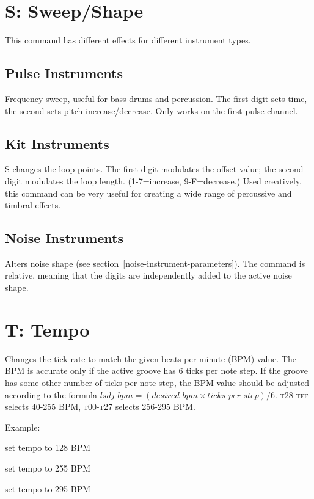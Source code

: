 \section{S: Sweep/Shape}

This command has different effects for different instrument types.

\subsection{Pulse Instruments}

Frequency sweep, useful for bass drums and percussion. The first digit sets time, the second sets pitch increase/decrease. Only works on the first pulse channel.

\subsection{Kit Instruments}

S changes the loop points. The first digit modulates the offset value; the second digit modulates the loop length. (1-7=increase, 9-F=decrease.) Used creatively, this command can be very useful for creating a wide range of percussive and timbral effects.

\subsection{Noise Instruments}

Alters noise shape (see section~\ref{noise-instrument-parameters}).
The command is relative, meaning that the digits are independently added to the active noise shape.

\section{T: Tempo}

Changes the tick rate to match the given beats per minute (BPM) value. The BPM is accurate only if the active groove has 6 ticks per note step. If the groove has some other number of ticks per note step, the BPM value should be adjusted according to the formula
\begin{math}
lsdj\_bpm = (desired\_bpm \times ticks\_per\_step)/{6}
\end{math}.
\textsc{t28}-\textsc{tff} selects 40-255 BPM, \textsc{t00}-\textsc{t27} selects 256-295 BPM.

\begin{description}
\item Example:
\item[T80] set tempo to 128 BPM
\item[TFF] set tempo to 255 BPM
\item[T27] set tempo to 295 BPM
\end{description}

